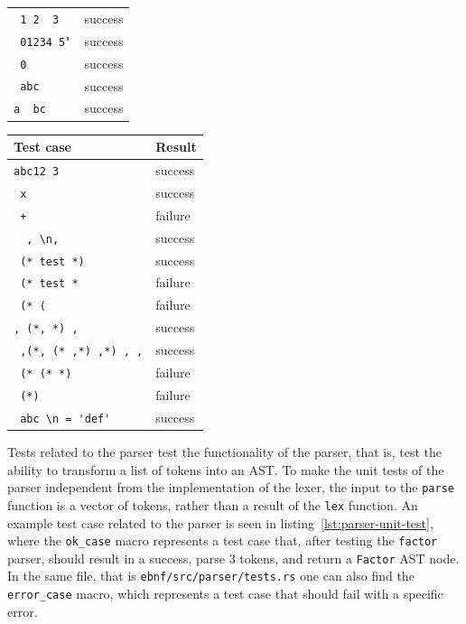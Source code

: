 \documentclass[english,engineering]{wizthesis}
\begin{document}
\begin{table}[H]
\begin{tabular}{@{}ll@{}}
    \verb*@ 1 2  3  @            & success \\
    \verb*@ 01234 5@"            & success \\
    \verb*@ 0 @                  & success \\
    \verb*@ abc @                & success \\
    \verb*@a  bc @               & success \\ \bottomrule
  \end{tabular}
  \hspace{0.5cm}
  \begin{tabular}{@{}ll@{}}
    \toprule
    Test case & Result \\ \midrule
    \verb*@abc12 3 @             & success \\
    \verb*@ x @                  & success \\
    \verb*@ + @                  & failure \\
    \verb*@  , \n,@              & success \\
    \verb*@ (* test *) @         & success \\
    \verb*@ (* test * @          & failure \\
    \verb*@ (* (@                & failure \\
    \verb*@, (*, *) , @          & success \\
    \verb*@ ,(*, (* ,*) ,*) , ,@ & success \\
    \verb*@ (* (* *) @           & failure \\
    \verb*@ (*) @                & failure \\
    \verb*@ abc \n = 'def' @     & success \\ \bottomrule
  \end{tabular}
\end{table}

Tests related to the parser test the functionality of the parser, that is, test
the ability to transform a list of tokens into an AST. To make the unit tests of
the parser independent from the implementation of the lexer, the input to the
\texttt{parse} function is a vector of tokens, rather than a result of the
\texttt{lex} function. An example test case related to the parser is seen in
listing~\ref{lst:parser-unit-test}, where the \texttt{ok\_case} macro represents
a test case that, after testing the \texttt{factor} parser, should result in a
success, parse 3 tokens, and return a \texttt{Factor} AST node. In the same
file, that is \texttt{ebnf/src/parser/tests.rs} one can also find the
\texttt{error\_case} macro, which represents a test case that should fail with a
specific error.
\end{document}
